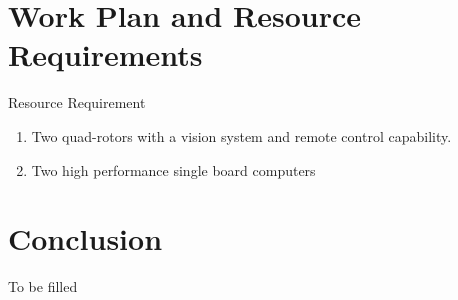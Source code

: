 \documentclass[a4paper,oneside,12pt]{report}
\begin{document}

\chapter{Work Plan and Resource Requirements}
\label{ch:work plan and resource requirements}


Resource Requirement

\begin{enumerate}
\item Two quad-rotors with a vision system and remote control capability.
\item Two high performance single board computers

\end{enumerate}


\chapter{Conclusion}
\label{ch:conlusion}

To be filled 


\renewcommand{\bibname}{\normalfont\selectfont\normalsize References}


\renewcommand{\bibname}{whatever}
\end{document}
